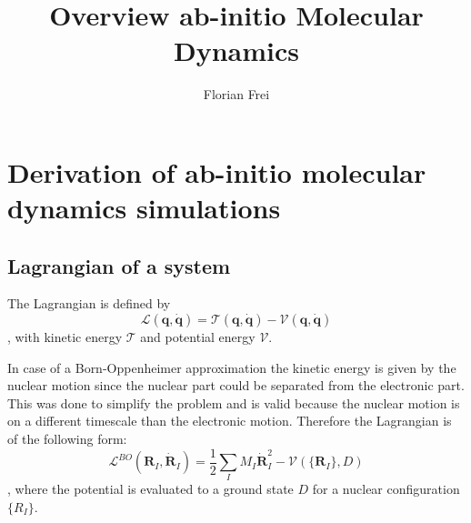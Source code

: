 \documentclass[12pt]{scrartcl}
\begin{document}
\author{Florian Frei}
\title{Overview ab-initio Molecular Dynamics}

\maketitle

\newpage

\tableofcontents

\newpage

\section{Derivation of ab-initio molecular dynamics simulations}
\subsection{Lagrangian of a system}
The Lagrangian is defined by
\begin{equation}
\mathcal{L}(\mathbf{q},\dot{\mathbf{q}}) = \mathcal{T}(\mathbf{q},\dot{\mathbf{q}}) - \mathcal{V}(\mathbf{q},\dot{\mathbf{q}})
\end{equation}
, with kinetic energy $\mathcal{T}$ and potential energy $\mathcal{V}$. 

In case of a Born-Oppenheimer approximation the kinetic energy is given by the nuclear motion since the nuclear part could be separated from the electronic part. This was done to simplify the problem and is valid because the nuclear motion is on a different timescale than the electronic motion. Therefore the Lagrangian is of the following form:
\begin{equation}
\mathcal{L}^{BO}(\mathbf{R}_I,\dot{\mathbf{R}}_I) = \frac{1}{2}\sum_{I}M_I\dot{\mathbf{R}}_I^2 - \mathcal{V}(\{\mathbf{R}_I\},D)
\end{equation}
, where the potential is evaluated to a ground state $D$ for a nuclear configuration $\{R_I\}$. 
\end{document}

